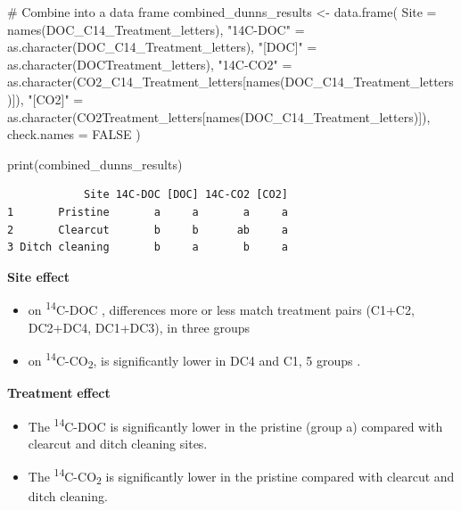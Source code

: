 \documentclass[
  letterpaper,
  DIV=11,
  numbers=noendperiod]{scrartcl}
\newenvironment{Shaded}{\begin{snugshade}}{\end{snugshade}}
\newcommand{\AttributeTok}[1]{\textcolor[rgb]{0.40,0.45,0.13}{#1}}
\newcommand{\CommentTok}[1]{\textcolor[rgb]{0.37,0.37,0.37}{#1}}
\newcommand{\ConstantTok}[1]{\textcolor[rgb]{0.56,0.35,0.01}{#1}}
\newcommand{\FunctionTok}[1]{\textcolor[rgb]{0.28,0.35,0.67}{#1}}
\newcommand{\NormalTok}[1]{\textcolor[rgb]{0.00,0.23,0.31}{#1}}
\newcommand{\OtherTok}[1]{\textcolor[rgb]{0.00,0.23,0.31}{#1}}
\newcommand{\StringTok}[1]{\textcolor[rgb]{0.13,0.47,0.30}{#1}}
\begin{document}
\begin{Shaded}
\begin{Highlighting}[]
        
\CommentTok{\# Combine into a data frame}
\NormalTok{combined\_dunns\_results }\OtherTok{\textless{}{-}} \FunctionTok{data.frame}\NormalTok{(}
  \AttributeTok{Site =} \FunctionTok{names}\NormalTok{(DOC\_C14\_Treatment\_letters),}
  \StringTok{"14C{-}DOC"} \OtherTok{=} \FunctionTok{as.character}\NormalTok{(DOC\_C14\_Treatment\_letters),}
  \StringTok{"[DOC]"} \OtherTok{=} \FunctionTok{as.character}\NormalTok{(DOCTreatment\_letters),}
  \StringTok{"14C{-}CO2"} \OtherTok{=} \FunctionTok{as.character}\NormalTok{(CO2\_C14\_Treatment\_letters[}\FunctionTok{names}\NormalTok{(DOC\_C14\_Treatment\_letters)]),}
  \StringTok{"[CO2]"} \OtherTok{=} \FunctionTok{as.character}\NormalTok{(CO2Treatment\_letters[}\FunctionTok{names}\NormalTok{(DOC\_C14\_Treatment\_letters)]),}
  \AttributeTok{check.names =} \ConstantTok{FALSE}
\NormalTok{)}

\FunctionTok{print}\NormalTok{(combined\_dunns\_results)}
\end{Highlighting}
\end{Shaded}

\begin{verbatim}
            Site 14C-DOC [DOC] 14C-CO2 [CO2]
1       Pristine       a     a       a     a
2       Clearcut       b     b      ab     a
3 Ditch cleaning       b     a       b     a
\end{verbatim}

\begin{tcolorbox}[enhanced jigsaw, opacitybacktitle=0.6, opacityback=0, arc=.35mm, left=2mm, toprule=.15mm, colback=white, coltitle=black, breakable, rightrule=.15mm, colbacktitle=quarto-callout-note-color!10!white, title=\textcolor{quarto-callout-note-color}{\faInfo}\hspace{0.5em}{Interpretation}, colframe=quarto-callout-note-color-frame, toptitle=1mm, bottomrule=.15mm, bottomtitle=1mm, titlerule=0mm, leftrule=.75mm]

\textbf{Site effect}

\begin{itemize}
\item
  on \textsuperscript{14}C-DOC , differences more or less match
  treatment pairs (C1+C2, DC2+DC4, DC1+DC3), in three groups
\item
  on \textsuperscript{14}C-CO\textsubscript{2}, is significantly lower
  in DC4 and C1, 5 groups .
\end{itemize}

\textbf{Treatment} \textbf{effect}

\begin{itemize}
\item
  The \textsuperscript{14}C-DOC is significantly lower in the pristine
  (group a) compared with clearcut and ditch cleaning sites.
\item
  The \textsuperscript{14}C-CO\textsubscript{2} is significantly lower
  in the pristine compared with clearcut and ditch cleaning.
\end{itemize}

\end{tcolorbox}
\end{document}
